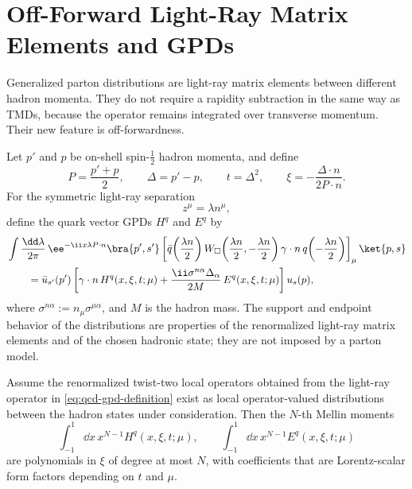 \section{Off-Forward Light-Ray Matrix Elements and GPDs}
\label{sec:qcd-gpd-light-ray-matrix-elements}

Generalized parton distributions are light-ray matrix elements between
different hadron momenta.  They do not require a rapidity subtraction in the
same way as TMDs, because the operator remains integrated over transverse
momentum.  Their new feature is off-forwardness.

Let \(p'\) and \(p\) be on-shell spin-\(\frac12\) hadron momenta, and define
\[
  P=\frac{p'+p}{2},
  \qquad
  \Delta=p'-p,
  \qquad
  t=\Delta^2,
  \qquad
  \xi=-\frac{\Delta\cdot n}{2P\cdot n}.
\]
For the symmetric light-ray separation
\[
  z^\mu=\lambda n^\mu ,
\]
define the quark vector GPDs \(H^q\) and \(E^q\) by
\begin{align}
  &\int\frac{\dd\lambda}{2\pi}\,
  \ee^{-\ii x\lambda P\cdot n}
  \bra{p',s'}
  \left[
  \bar q\!\left(\frac{\lambda n}{2}\right)
  W_{\square}\!\left(\frac{\lambda n}{2},-\frac{\lambda n}{2}\right)
  \gamma\cdot n\,
  q\!\left(-\frac{\lambda n}{2}\right)
  \right]_{\mu}
  \ket{p,s}
  \notag\\
  &\qquad =
  \bar u_{s'}(p')
  \left[
    \gamma\cdot n\,H^q(x,\xi,t;\mu)
    +\frac{\ii\sigma^{n\alpha}\Delta_\alpha}{2M}\,
    E^q(x,\xi,t;\mu)
  \right]
  u_s(p),
  \label{eq:qcd-gpd-definition}
\end{align}
where \(\sigma^{n\alpha}:=n_\mu\sigma^{\mu\alpha}\), and \(M\) is the hadron
mass.  The support and endpoint behavior of the distributions are properties
of the renormalized light-ray matrix elements and of the chosen hadronic
state; they are not imposed by a parton model.

\begin{lemma}
\label{lem:qcd-gpd-polynomiality}
Assume the renormalized twist-two local operators obtained from the light-ray
operator in \eqref{eq:qcd-gpd-definition} exist as local operator-valued
distributions between the hadron states under consideration.  Then the
\(N\)-th Mellin moments
\[
  \int_{-1}^{1}\dd x\,x^{N-1}H^q(x,\xi,t;\mu),
  \qquad
  \int_{-1}^{1}\dd x\,x^{N-1}E^q(x,\xi,t;\mu)
\]
are polynomials in \(\xi\) of degree at most \(N\), with coefficients that are
Lorentz-scalar form factors depending on \(t\) and \(\mu\).
\end{lemma}

